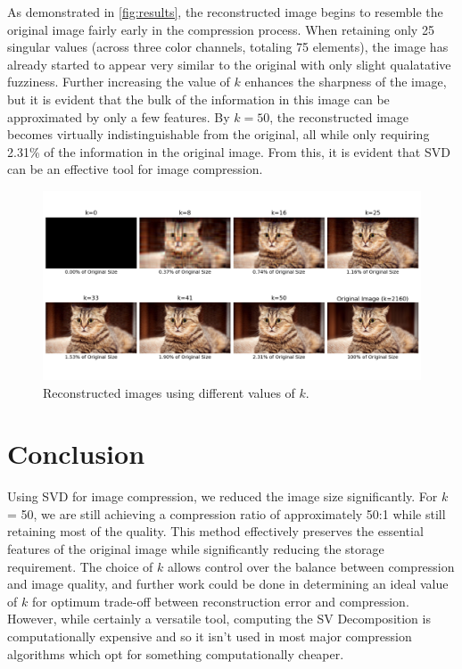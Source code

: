 \documentclass[12pt]{article}
\begin{document}
As demonstrated in \autoref{fig:results}, the reconstructed image begins to resemble the original image fairly early in the compression process. When retaining only 25 singular values (across three color channels, totaling 75 elements), the image has already started to appear very similar to the original with only slight qualatative fuzziness. Further increasing the value of \( k \) enhances the sharpness of the image, but it is evident that the bulk of the information in this image can be approximated by only a few features. By \( k = 50 \), the reconstructed image becomes virtually indistinguishable from the original, all while only requiring 2.31\% of the information in the original image. From this, it is evident that SVD can be an effective tool for image compression.

\begin{figure}[h]
    \centering
    \includegraphics[width=\textwidth]{results.png}
    \caption{Reconstructed images using different values of \( k \).}
    \label{fig:results}
\end{figure}

\section{Conclusion}
Using SVD for image compression, we reduced the image size significantly. For \(k\) = 50, we are still achieving a compression ratio of approximately 50:1 while still retaining most of the quality. This method effectively preserves the essential features of the original image while significantly reducing the storage requirement. The choice of \(k\) allows control over the balance between compression and image quality, and further work could be done in determining an ideal value of \(k\) for optimum trade-off between reconstruction error and compression. However, while certainly a versatile tool, computing the SV Decomposition is computationally expensive and so it isn't used in most major compression algorithms which opt for something computationally cheaper.
\end{document}
